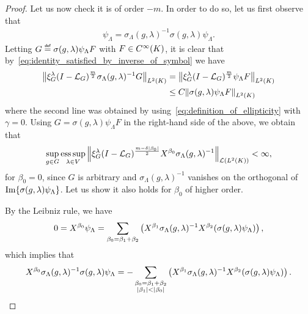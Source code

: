 \begin{proof}
    Let us now check it is of order $-m$.
    In order to do so,
    let us first observe that
    \begin{align}
        \psi_\Lambda = \sigma_\Lambda(g, \lambda)^{-1} \sigma(g, \lambda) \psi_\Lambda.
        \label{eq:identity_satisfied_by_inverse_of_symbol}
    \end{align}
    Letting $G \defeq \sigma(g, \lambda) \psi_\Lambda F$ with $F \in \SmoothFunctions \CompactGroup$,
    it is clear that by~\eqref{eq:identity_satisfied_by_inverse_of_symbol} we have
    \begin{align*}
        \norm [\Lebesgue 2 \CompactGroup] {\Rep \lambda \BesselPotential m \sigma_\Lambda(g, \lambda)^{-1} G}
        &=
        \norm [\Lebesgue 2 \CompactGroup] {\Rep \lambda \BesselPotential m \psi_\Lambda F}\\
        &\leq C
        \norm [\Lebesgue 2 \CompactGroup] {\sigma(g, \lambda) \psi_\Lambda F}\\
    \end{align*}
    where the second line was obtained
    by using~\eqref{eq:definition_of_ellipticity} with $\gamma = 0$.
    Using $G = \sigma(g, \lambda) \psi_\Lambda F$ in the right-hand side of the above,
    we obtain that
    \begin{align*}
        \sup_{g \in \Group}
        \esssup_{\lambda \in \VectorSpace}
        \norm [\Lin {\Lebesgue 2 \CompactGroup}] {\Rep \lambda \BesselPotential {m - \delta \abs {\beta_0}} \LeftDifferentialOperator {\beta_0} \sigma_\Lambda(g, \lambda)^{-1}}
        < \infty,
    \end{align*}
    for $\beta_0 = 0$,
    since $G$ is arbitrary and $\sigma_\Lambda(g, \lambda)^{-1}$ vanishes on the orthogonal of $\Image \{\sigma(g, \lambda) \psi_\Lambda\}$.
    Let us show it also holds for $\beta_0$ of higher order.

    By the Leibniz rule,
    we have
    \begin{align*}
        0 =
        \LeftDifferentialOperator {\beta_0} \psi_\Lambda
        =
        \sum_{\beta_0 = \beta_1 + \beta_2}
        \left(
        \LeftDifferentialOperator {\beta_1} \sigma_\Lambda(g, \lambda)^{-1}
        \LeftDifferentialOperator {\beta_2} (\sigma(g, \lambda) \psi_\Lambda)\right),
    \end{align*}
    which implies that
    \begin{align*}
        \LeftDifferentialOperator {\beta_0} \sigma_{\Lambda}(g, \lambda)^{-1} \sigma(g, \lambda) \psi_\Lambda
        = -
        \sum_{\substack{
            \beta_0 = \beta_1 + \beta_2\\
            \abs {\beta_1} < \abs {\beta_0}}
        }
        \left(
        \LeftDifferentialOperator {\beta_1} \sigma_\Lambda(g, \lambda)^{-1}
        \LeftDifferentialOperator {\beta_2} (\sigma(g, \lambda) \psi_\Lambda)\right).
    \end{align*}


\end{proof}
